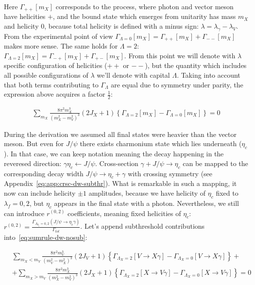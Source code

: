 Here $\Gamma_{++}[m_X]$ corresponds to the process, where photon and vector meson have helicities $+$, and the bound state which emerges from unitarity has mass $m_X$ and helicity $0$, because total helicity is defined with a minus sign: $\lambda = \lambda_\gamma - \lambda_V$. From the experimental point of view $\Gamma_{\Lambda=0}[m_X] = \Gamma_{++}[m_X] + \Gamma_{--}[m_X]$ makes more sense. The same holds for $\Lambda=2$: $\Gamma_{\Lambda=2}[m_X] = \Gamma_{-+}[m_X] + \Gamma_{+-}[m_X]$. From this point we will denote with $\lambda$ specific configuration of helicities ($++$ or $--$), but the quantity which includes all possible configurations of $\lambda$ we'll denote with capital $\Lambda$. Taking into account that both terms contributing to $\Gamma_{\Lambda}$ are equal due to symmetry under parity, the expression above acquires a factor $\frac{1}{2}$:


\begin{align} \label{eq:sumrule-dw-nosub}
    \sum_{m_X} \frac{8 \pi^2 m_X^3}{(m_X^2 - m_V^2)^3} (2J_X+1) \left\{\Gamma_{\Lambda=2}[m_X] - \Gamma_{\Lambda=0}[m_X] \right\} = 0
\end{align}

During the derivation we assumed all final states were heavier than the vector meson. But even for $J/\psi$ there exists charmonium state which lies underneath ($\eta_c$). In that case, we can keep notation meaning the decay happening in the reveresed direction: $\gamma \eta_c \leftarrow J/\psi$. Cross-section $\gamma + J/\psi \rightarrow \eta_c$ can be mapped to the corresponding decay width $J/\psi \rightarrow \eta_c + \gamma$ with crossing symmetry (see Appendix~\cref{eq:app:crsc-dw-subthr}). What is remarkable in such a mapping, it now can include helicity $\pm1$ amplitudes, because we have helicity of $\eta_c$ fixed to $\lambda_f = 0, 2$, but $\eta_c$ appears in the final state with a photon. Nevertheless, we still can introduce $r^{(0,2)}$ coefficients, meaning fixed helicities of $\eta_c$: $r^{(0,2)} = \frac{\Gamma_{\Lambda_{\eta_c} = 0,2}(J/\psi \rightarrow \eta_c \gamma)}{\Gamma_{tot}}$. Let's append subthreshold contributions into~\cref{eq:sumrule-dw-nosub}:

\begin{align} \label{eq:sumrule-dw}
    &\sum_{m_X < m_V} \frac{8 \pi^2 m_V^3}{(m_V^2 - m_X^2)^3} (2J_V+1) \left\{\Gamma_{\Lambda_X = 2}\left[V \rightarrow X \gamma\right] - \Gamma_{\Lambda_X = 0}\left[V \rightarrow X \gamma\right] \right\} + \nonumber \\
    &+ \sum_{m_X > m_V} \frac{8 \pi^2 m_X^3}{(m_X^2 - m_V^2)^3} (2J_X+1) \left\{\Gamma_{\Lambda_X=2}\left[X \rightarrow V \gamma \right] - \Gamma_{\Lambda_X = 0}\left[X \rightarrow V\gamma \right] \right\} = 0
\end{align}


